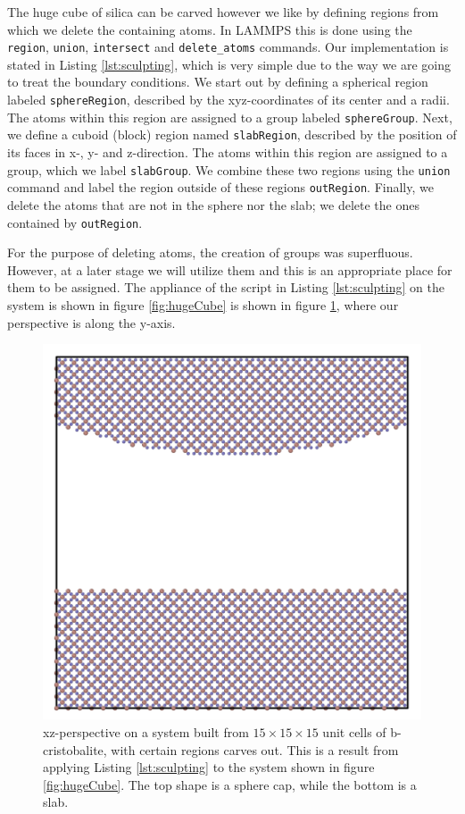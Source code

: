\documentclass[twoside,english]{uiofysmaster}
\begin{document}
The huge cube of silica can be carved however we like by defining regions from which we delete the containing atoms. 
In LAMMPS this is done using the \texttt{region}, \texttt{union}, \texttt{intersect} and \texttt{delete\_atoms} commands. 
Our implementation is stated in Listing \ref{lst:sculpting}, which is very simple due to the way we are going to treat the boundary conditions. 
We start out by defining a spherical region labeled \texttt{sphereRegion}, described by the xyz-coordinates of its center and a radii. 
The atoms within this region are assigned to a group labeled \texttt{sphereGroup}. 
Next, we define a cuboid (block) region named \texttt{slabRegion}, described by the position of its faces in x-, y- and z-direction. 
The atoms within this region are assigned to a group, which we label \texttt{slabGroup}.  
We combine these two regions using  the \texttt{union} command and label the region outside of these regions \texttt{outRegion}.
Finally, we delete the atoms that are not in the sphere nor the slab; we delete the ones contained by \texttt{outRegion}.

For the purpose of deleting atoms, the creation of groups was superfluous. %
However, at a later stage we will utilize them and this is an appropriate place for them to be assigned. 
The appliance of the script in Listing \ref{lst:sculpting} on the system is shown in figure \ref{fig:hugeCube} is shown in figure \ref{fig:carvedxz}, where our perspective is along the y-axis.

\begin{figure}[H]
\centering
\includegraphics[width=0.7\linewidth]{figures/CreatingSystem/carved_xz.png}
\caption{xz-perspective on a system built from $15\times15\times15$ unit cells of b-cristobalite, with certain regions carves out. This is a result from applying Listing \ref{lst:sculpting} to the system shown in figure \ref{fig:hugeCube}. The top shape is a sphere cap, while the bottom is a slab.}
\label{fig:carvedxz}
\end{figure}
\end{document}
